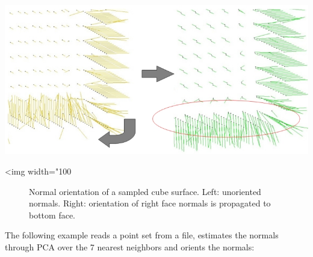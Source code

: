 \begin{center}
    \label{Point_set_processing_3-fig-mst_orient_normals}
    \begin{ccTexOnly}
        \includegraphics[width=1.0\textwidth]{Point_set_processing_3/mst_orient_normals} %
    \end{ccTexOnly}
    \begin{ccHtmlOnly}
        <img width="100%
    \end{ccHtmlOnly}
    \begin{figure}[h]
        \caption{Normal orientation of a sampled cube surface.
                 Left: unoriented normals.
                 Right: orientation of right face normals is propagated to bottom face.}
    \end{figure}
\end{center}

\ccExample

The following example reads a point set from a file, estimates the normals through PCA over the 7 nearest neighbors and orients the normals:



